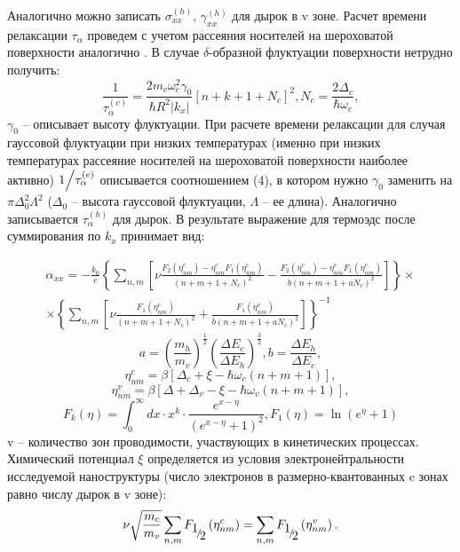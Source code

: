 Аналогично можно записать $\sigma _{xx}^{(h)} $, $\gamma _{xx}^{(h)} $ для дырок в v зоне. Расчет времени релаксации $\tau _{\alpha } $ проведем с учетом рассеяния носителей на шероховатой поверхности аналогично \cite{Karapetyan2011}. В случае $\delta $-образной флуктуации поверхности нетрудно получить:
\begin{equation} \label{eq:44_40}
\frac{1}{\tau _{\alpha }^{(c)} } =\frac{2m_{c} \omega _{c}^{2} \gamma _{0} }{\hbar R^{2} \left|k_{x} \right|} \left[n+k+1+N_{c} \right]^{2} , N_{c} =\frac{2\Delta _{c} }{\hbar \omega _{c} } ,
\end{equation} 
$\gamma _{0} $ -- описывает высоту флуктуации. При расчете времени релаксации для случая гауссовой флуктуации \cite{Vurgaftman1999} при низких температурах (именно при низких температурах рассеяние носителей на шероховатой поверхности наиболее активно) ${1 \mathord{\left/{\vphantom{1 \tau _{\alpha }^{(e)} }}\right.\kern-\nulldelimiterspace} \tau _{\alpha }^{(e)} } $ описывается соотношением (4), в котором нужно $\gamma _{0} $ заменить на $\pi \Delta _{0}^{2} \Lambda ^{2} $ ($\Delta _{0} $ -- высота гауссовой флуктуации, $\Lambda $ -- ее длина). Аналогично записывается $\tau _{\alpha }^{(h)} $ для дырок. В результате выражение для термоэдс после суммирования по $k_{x} $ принимает вид:
 
\begin{multline} \label{eq:44_50}
\alpha _{xx} =-\frac{k_{0} }{e} \left\{\sum _{n,m}\left[\nu \frac{F_{2} \left(\eta _{nm}^{c} \right)-\eta _{nm}^{c} F_{1} \left(\eta _{nm}^{c} \right)}{\left(n+m+1+N_{c} \right)^{2} } -\frac{F_{2} \left(\eta _{nm}^{v} \right)-\eta _{nm}^{v} F_{1} \left(\eta _{nm}^{v} \right)}{b\left(n+m+1+aN_{c} \right)^{2} } \right] \right\}\times\\
\times \left\{\sum _{n,m}\left[\nu \frac{F_{1} \left(\eta _{nm}^{c} \right)}{\left(n+m+1+N_{c} \right)^{2} } +\frac{F_{1} \left(\eta _{nm}^{v} \right)}{b\left(n+m+1+aN_{c} \right)^{2} } \right] \right\}^{-1}
\end{multline}
\[
a=\left(\frac{m_{h} }{m_{c} } \right)^{\frac{1}{2} } \left(\frac{\Delta E_{c} }{\Delta E_{h} } \right)^{\frac{3}{2} } , b=\frac{\Delta E_{h} }{\Delta E_{c} } ,
\] 
\[
\eta _{nm}^{c} =\beta \left[\Delta _{c} +\xi -\hbar \omega _{c} \left(n+m+1\right)\right],
\] 
\[
\eta _{nm}^{v} =\beta \left[\Delta +\Delta _{v} -\xi -\hbar \omega _{v} \left(n+m+1\right)\right],
\] 
\[
F_{k} (\eta )=\int _{0}^{\infty }dx \cdot x^{k} \cdot \frac{e^{x-\eta } }{\left(e^{x-\eta } +1\right)^{2} } , F_{1} (\eta )=\ln \left(e^{\eta } +1\right)
\] 
v -- количество зон проводимости, участвующих в кинетических процессах. Химический потенциал $\xi $ определяется из условия электронейтральности исследуемой наноструктуры (число электронов в размерно-квантованных c зонах равно числу дырок в v зоне):
\begin{equation} \label{eq:44_60}
\nu \sqrt{\frac{m_{c} }{m_{v} } } \sum _{n,m}F_{{\raise0.7ex\hbox{$ 1 $}\!\mathord{\left/{\vphantom{1 2}}\right.\kern-\nulldelimiterspace}\!\lower0.7ex\hbox{$ 2 $}} } \left(\eta _{nm}^{c} \right) =\sum _{n,m}F_{{\raise0.7ex\hbox{$ 1 $}\!\mathord{\left/{\vphantom{1 2}}\right.\kern-\nulldelimiterspace}\!\lower0.7ex\hbox{$ 2 $}} } \left(\eta _{nm}^{v} \right) .
\end{equation}
 
